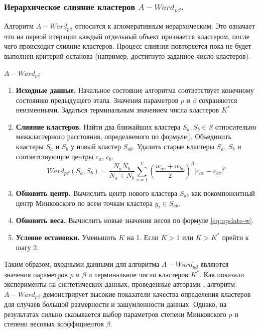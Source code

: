 \documentclass[12pt,twoside,a4paper,tikz,border=5]{refart}
\begin{document}
			\subsubsection{ Иерархическое слияние кластеров $ A-Ward_{p\beta} $.}
				Алгоритм  $ A-Ward_{p\beta} $ относится к агломеративным иерархическим. Это означает что на первой итерации каждый отдельный объект признается кластером, после чего происходит слияние кластеров. Процесс слияния повторяется пока не будет выполнен критерий останова (например, достигнуто заданное число кластеров). 
				\begin{algorithm}{\boldmath$ A-Ward_{p\beta} $ }{}
					\begin{enumerate}
						\item \textbf{Исходные данные.} Начальное состояние алгоритма соответствует конечному состоянию предыдущего этапа. Значения параметров $ p $ и $ \beta $ сохраняются неизменными. Задаться терминальным значением числа кластеров $ K^* $
						\item \textbf{Слияние кластеров.} Найти два ближайших кластера $ S_a,S_b \in S $ относительно межкластерного расстояния, определяемого по формуле\eqref{}. Объединить кластеры $ S_a $ и $ S_b $ у новый кластер $ S_{ab} $. Удалить старые кластеры $ S_a $, $ S_b $ и соответствующие центры $ c_a $, $ c_b $.
						\begin{equation}
							Ward_{p\beta}(S_a,S_b)=\dfrac{N_aN_b}{N_a+N_b}\sum_{v=1}^{V}\left( \dfrac{w_{av}+w_{bv}}{2} \right) ^\beta |c_{av}-c_{bv}|^p
						\end{equation}
						\item \textbf{Обновить центр.} Вычислить центр нового кластера $ S_{ab} $ как покомпонентный центр Минковского по всем точкам кластера $ y_i \in S_{ab} $.
						\item \textbf{Обновить веса.} Вычислить новые значения весов по формуле \eqref{eq:update-w}.
						\item \textbf{Условие остановки.} Уменьшить $ K $ на 1. Если $ K>1 $ или $ K>K^* $ прейти к шагу 2.
					\end{enumerate}
				\end{algorithm}
				Таким образом, входными данными для алгоритма $ A-Ward_{p\beta} $ являются значения параметров $ p $ и $ \beta $ и терминальное число кластеров $ K^* $. Как показали эксперименты на синтетических данных, проведенные авторами \cite{a-ward-pb}, алгоритм  $ A-Ward_{p\beta} $ демонстрирует высокие показатели качества определения кластеров для случаев большой размерности и зашумленности данных. Однако, на результатах сильно сказывается выбор параметров степени Минковского $ p $ и степени весовых коэффициентов $ \beta $.
\end{document}
